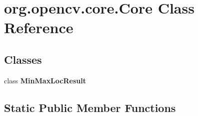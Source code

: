 \hypertarget{classorg_1_1opencv_1_1core_1_1_core}{}\section{org.\+opencv.\+core.\+Core Class Reference}
\label{classorg_1_1opencv_1_1core_1_1_core}
\subsection*{Classes}
\begin{DoxyCompactItemize}
\item 
class {\bfseries Min\+Max\+Loc\+Result}
\end{DoxyCompactItemize}
\subsection*{Static Public Member Functions}

